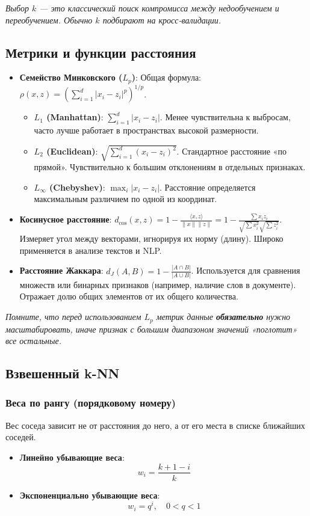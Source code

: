 \documentclass[12pt]{article}
\newcommand{\commentary}[1]{{\small\itshape\color{commentgray} #1}}
\begin{document}
\commentary{Выбор $k$ — это классический поиск компромисса между недообучением и переобучением. Обычно $k$ подбирают на кросс-валидации.}

\subsection{Метрики и функции расстояния}

\begin{itemize}
    \item \textbf{Семейство Минковского ($L_p$)}: Общая формула: $\rho(x, z) = \left( \sum_{i=1}^d |x_i - z_i|^p \right)^{1/p}$. 
    \begin{itemize}
        \item \textbf{$L_1$ (Manhattan)}: $\sum_{i=1}^d |x_i - z_i|$. Менее чувствительна к выбросам, часто лучше работает в пространствах высокой размерности.
        \item \textbf{$L_2$ (Euclidean)}: $\sqrt{\sum_{i=1}^d (x_i - z_i)^2}$. Стандартное расстояние «по прямой». Чувствительно к большим отклонениям в отдельных признаках.
        \item \textbf{$L_\infty$ (Chebyshev)}: $\max_i |x_i - z_i|$. Расстояние определяется максимальным различием по одной из координат.
    \end{itemize}
    \item \textbf{Косинусное расстояние}: 
    $d_{\cos}(x, z) = 1 - \frac{\langle x, z \rangle}{\|x\| \|z\|} = 1 - \frac{\sum x_i z_i}{\sqrt{\sum x_i^2} \sqrt{\sum z_i^2}}$. 
    Измеряет угол между векторами, игнорируя их норму (длину). Широко применяется в анализе текстов и NLP.
    \item \textbf{Расстояние Жаккара}: 
    $d_J(A, B) = 1 - \frac{|A \cap B|}{|A \cup B|}$. 
    Используется для сравнения множеств или бинарных признаков (например, наличие слов в документе). Отражает долю общих элементов от их общего количества.
\end{itemize}

\commentary{Помните, что перед использованием $L_p$ метрик данные \textbf{обязательно} нужно масштабировать, иначе признак с большим диапазоном значений «поглотит» все остальные.}

\subsection{Взвешенный k-NN}

\subsubsection{Веса по рангу (порядковому номеру)}
Вес соседа зависит не от расстояния до него, а от его места в списке ближайших соседей.
\begin{itemize}
    \item \textbf{Линейно убывающие веса}: 
    \[ w_i = \frac{k+1-i}{k} \]
    \item \textbf{Экспоненциально убывающие веса}: 
    \[ w_i = q^i, \quad 0 < q < 1 \]
\end{itemize}
\end{document}
